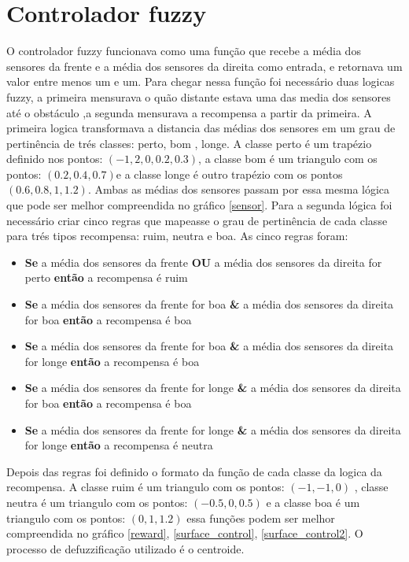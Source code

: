 \documentclass[
	12pt,				%
	openright,			%
	oneside,			%
	a4paper,			%
	brazil,				%
	]{abntex2}
\begin{document}
\section{Controlador fuzzy}
O controlador fuzzy funcionava como uma função que recebe a média dos sensores da frente e a média dos sensores da direita como entrada, e retornava um valor entre menos um e um. Para chegar nessa função foi necessário duas logicas fuzzy, a primeira mensurava o quão distante estava uma das media dos sensores  até o obstáculo ,a segunda mensurava a recompensa a partir  da primeira. A primeira logica transformava a distancia das médias dos sensores em um grau de pertinência de trés classes: perto, bom , longe. A classe perto é um trapézio definido nos pontos: $(-1,2,0,0.2,0.3)$, a classe bom é um triangulo com os pontos: $(0.2, 0.4, 0.7)$e a classe longe é outro trapézio com os pontos $(0.6, 0.8, 1, 1.2)$. Ambas as médias dos sensores passam por essa mesma lógica que pode ser melhor compreendida no gráfico \ref{sensor}. Para a segunda lógica foi necessário criar cinco regras que mapeasse o grau de pertinência de cada classe para trés tipos recompensa: ruim, neutra e boa. As cinco regras foram:
\begin{itemize}
	\item \textbf{Se} a média dos sensores da frente \textbf{OU} a média dos sensores da direita for perto \textbf{então} a recompensa é ruim
	\item \textbf{Se} a média dos sensores da frente for boa \textbf{\&} a média dos sensores da direita for boa \textbf{então} a recompensa é boa 
	\item \textbf{Se} a média dos sensores da frente for boa \textbf{\&} a média dos sensores da direita for longe \textbf{então} a recompensa é boa 
	\item \textbf{Se} a média dos sensores da frente for longe \textbf{\&} a média dos sensores da direita for boa \textbf{então} a recompensa é boa 
\	\item \textbf{Se} a média dos sensores da frente for longe \textbf{\&} a média dos sensores da direita for longe \textbf{então} a recompensa é neutra
\end{itemize}
Depois das regras foi definido o formato da função de cada classe da logica da recompensa. A classe ruim é um triangulo com os pontos: $(-1, -1, 0)$ , classe neutra é um triangulo com os pontos: $(-0.5, 0, 0.5)$ e a classe boa é um triangulo com os pontos: $(0, 1, 1.2)$ essa funções podem ser melhor compreendida no gráfico \ref{reward}, \ref{surface_control}, \ref{surface_control2}. O processo de defuzzificação utilizado é o centroide.
\end{document}
